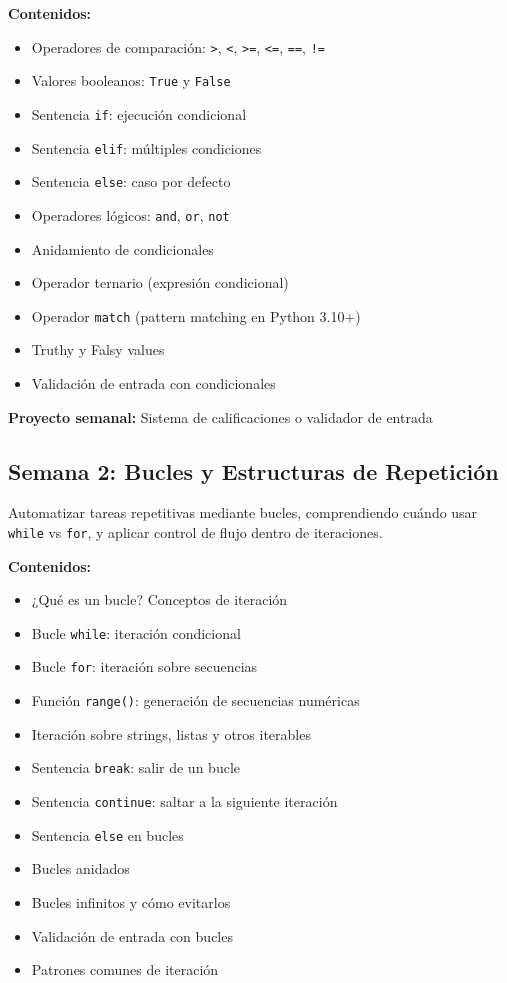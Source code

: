 \documentclass[12pt,letterpaper]{article}
\begin{document}
\textbf{Contenidos:}
\begin{itemize}[leftmargin=*]
    \item Operadores de comparación: \texttt{>}, \texttt{<}, \texttt{>=}, \texttt{<=}, \texttt{==}, \texttt{!=}
    \item Valores booleanos: \texttt{True} y \texttt{False}
    \item Sentencia \texttt{if}: ejecución condicional
    \item Sentencia \texttt{elif}: múltiples condiciones
    \item Sentencia \texttt{else}: caso por defecto
    \item Operadores lógicos: \texttt{and}, \texttt{or}, \texttt{not}
    \item Anidamiento de condicionales
    \item Operador ternario (expresión condicional)
    \item Operador \texttt{match} (pattern matching en Python 3.10+)
    \item Truthy y Falsy values
    \item Validación de entrada con condicionales
\end{itemize}

\textbf{Proyecto semanal:} Sistema de calificaciones o validador de entrada

\subsection{Semana 2: Bucles y Estructuras de Repetición}

\begin{objetivobox}
Automatizar tareas repetitivas mediante bucles, comprendiendo cuándo usar \texttt{while} vs \texttt{for}, y aplicar control de flujo dentro de iteraciones.
\end{objetivobox}

\textbf{Contenidos:}
\begin{itemize}[leftmargin=*]
    \item ¿Qué es un bucle? Conceptos de iteración
    \item Bucle \texttt{while}: iteración condicional
    \item Bucle \texttt{for}: iteración sobre secuencias
    \item Función \texttt{range()}: generación de secuencias numéricas
    \item Iteración sobre strings, listas y otros iterables
    \item Sentencia \texttt{break}: salir de un bucle
    \item Sentencia \texttt{continue}: saltar a la siguiente iteración
    \item Sentencia \texttt{else} en bucles
    \item Bucles anidados
    \item Bucles infinitos y cómo evitarlos
    \item Validación de entrada con bucles
    \item Patrones comunes de iteración
\end{itemize}
\end{document}
